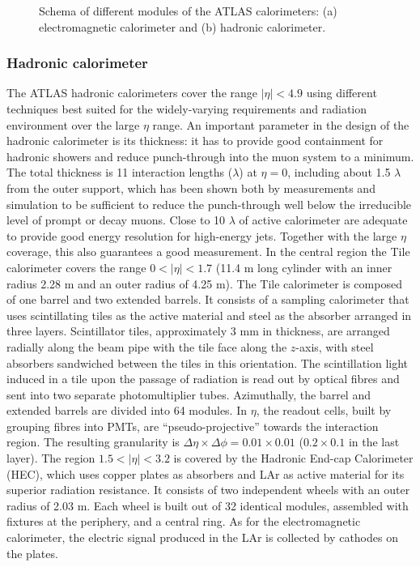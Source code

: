 \begin{figure}[t!]
\caption{Schema of different modules of the ATLAS calorimeters: (a) electromagnetic
calorimeter and (b) hadronic calorimeter.}
\label{chp:det:atlas:cal}
\end{figure}



\subsubsection{Hadronic calorimeter}
The ATLAS hadronic calorimeters cover the range $|\eta|< 4.9$ using different techniques best suited for the widely-varying requirements and radiation environment over the large $\eta$ range. An important parameter in the design of the hadronic calorimeter is its thickness: it has to provide good containment for hadronic showers and reduce punch-through into the muon system to a minimum. The total thickness is 11 interaction lengths ($\lambda$) at $\eta = 0$, including about 1.5 $\lambda$ from the outer support, which has been shown both by measurements and simulation to be sufficient to reduce the punch-through well below the irreducible level of prompt or decay muons. Close to 10 $\lambda$ of active calorimeter are adequate to provide good energy resolution for high-energy jets. Together with the large $\eta$ coverage, this also guarantees a good \MET  measurement.
In the central region the Tile calorimeter covers the range $0 < |\eta| < 1.7$ (11.4 m long cylinder with an inner radius 2.28 m and an outer radius of 4.25 m). The Tile calorimeter is composed of one barrel and two extended barrels. It consists of a sampling calorimeter that uses scintillating tiles as the active material and steel as the absorber arranged in three layers. Scintillator tiles, approximately 3 mm in thickness, are arranged radially along the beam pipe with the tile face along the $z$-axis, with steel absorbers sandwiched between the tiles in this orientation. The scintillation light induced in a tile upon the passage of radiation is read out by optical fibres and sent into two separate photomultiplier tubes. Azimuthally, the barrel and extended barrels are divided into 64 modules. In $\eta$, the readout cells, built by grouping fibres into PMTs, are ``pseudo-projective'' towards the interaction region. The resulting granularity is $\Delta \eta \times \Delta \phi =  0.01 \times 0.01$ ($0.2\times0.1$ in the last layer).
The region $1.5< |\eta| < 3.2$ is covered by the Hadronic End-cap Calorimeter (HEC), which uses copper plates as absorbers and LAr as active material for its superior radiation resistance. It  consists of two independent wheels with an outer radius of 2.03 m. Each wheel is built out of 32 identical modules, assembled with fixtures at the periphery, and a central ring. As for the electromagnetic calorimeter, the electric signal produced in the LAr is collected by cathodes on the plates. 
